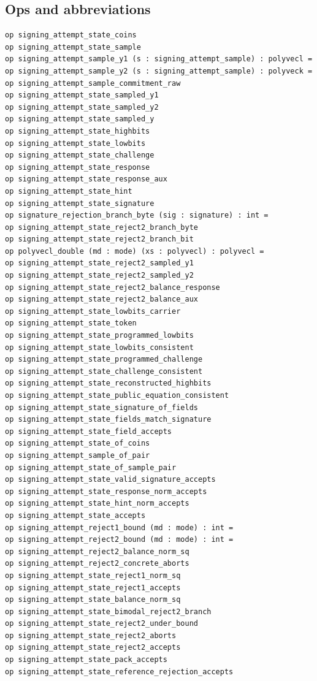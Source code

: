 \subsection*{Ops and abbreviations}
\begin{lstlisting}[language=EasyCrypt,basicstyle=\ttfamily\tiny]
op signing_attempt_state_coins
op signing_attempt_state_sample
op signing_attempt_sample_y1 (s : signing_attempt_sample) : polyvecl =
op signing_attempt_sample_y2 (s : signing_attempt_sample) : polyveck =
op signing_attempt_sample_commitment_raw
op signing_attempt_state_sampled_y1
op signing_attempt_state_sampled_y2
op signing_attempt_state_sampled_y
op signing_attempt_state_highbits
op signing_attempt_state_lowbits
op signing_attempt_state_challenge
op signing_attempt_state_response
op signing_attempt_state_response_aux
op signing_attempt_state_hint
op signing_attempt_state_signature
op signature_rejection_branch_byte (sig : signature) : int =
op signing_attempt_state_reject2_branch_byte
op signing_attempt_state_reject2_branch_bit
op polyvecl_double (md : mode) (xs : polyvecl) : polyvecl =
op signing_attempt_state_reject2_sampled_y1
op signing_attempt_state_reject2_sampled_y2
op signing_attempt_state_reject2_balance_response
op signing_attempt_state_reject2_balance_aux
op signing_attempt_state_lowbits_carrier
op signing_attempt_state_token
op signing_attempt_state_programmed_lowbits
op signing_attempt_state_lowbits_consistent
op signing_attempt_state_programmed_challenge
op signing_attempt_state_challenge_consistent
op signing_attempt_state_reconstructed_highbits
op signing_attempt_state_public_equation_consistent
op signing_attempt_state_signature_of_fields
op signing_attempt_state_fields_match_signature
op signing_attempt_state_field_accepts
op signing_attempt_state_of_coins
op signing_attempt_sample_of_pair
op signing_attempt_state_of_sample_pair
op signing_attempt_state_valid_signature_accepts
op signing_attempt_state_response_norm_accepts
op signing_attempt_state_hint_norm_accepts
op signing_attempt_state_accepts
op signing_attempt_reject1_bound (md : mode) : int =
op signing_attempt_reject2_bound (md : mode) : int =
op signing_attempt_reject2_balance_norm_sq
op signing_attempt_reject2_concrete_aborts
op signing_attempt_state_reject1_norm_sq
op signing_attempt_state_reject1_accepts
op signing_attempt_state_balance_norm_sq
op signing_attempt_state_bimodal_reject2_branch
op signing_attempt_state_reject2_under_bound
op signing_attempt_state_reject2_aborts
op signing_attempt_state_reject2_accepts
op signing_attempt_state_pack_accepts
op signing_attempt_state_reference_rejection_accepts

\end{lstlisting}
